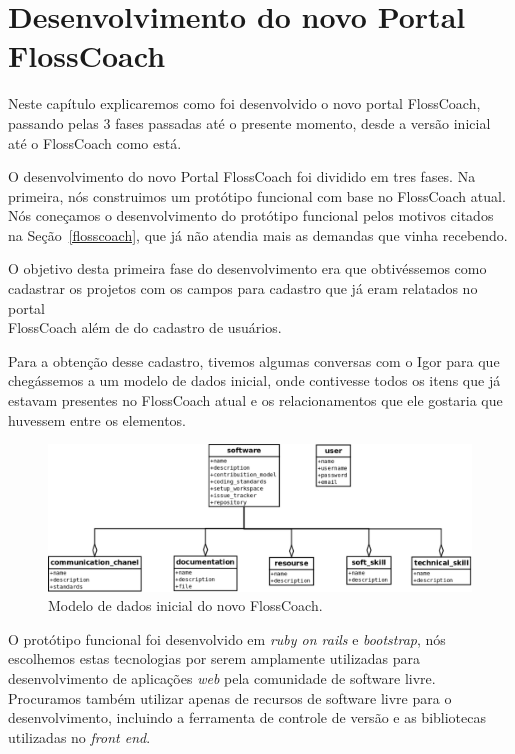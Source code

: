 \chapter{Desenvolvimento do novo Portal \\FlossCoach}
\label{desenvolvimento}

Neste capítulo explicaremos como foi desenvolvido o novo portal FlossCoach, passando
pelas 3 fases passadas até o presente momento, desde a versão inicial até o FlossCoach
como está.

O desenvolvimento do novo Portal FlossCoach foi dividido em tres fases. Na primeira, 
nós construimos um protótipo funcional com base no FlossCoach atual. Nós coneçamos o
desenvolvimento do protótipo funcional pelos motivos citados na Seção~\ref{flosscoach},
que já não atendia mais as demandas que vinha recebendo.

O objetivo desta primeira fase do desenvolvimento era que obtivéssemos como cadastrar 
os projetos com os campos para cadastro que já eram relatados no portal \\FlossCoach 
além de do cadastro de usuários.

Para a obtenção desse cadastro, tivemos algumas conversas com o Igor para que chegássemos
a um modelo de dados inicial, onde contivesse todos os itens que já estavam presentes no
FlossCoach atual e os relacionamentos que ele gostaria que huvessem entre os elementos.

\begin{figure}[h]
	\centering
	\label{fig:diagrama_iicial}
		\includegraphics[keepaspectratio=true,scale=0.35]{figuras/diagrama_inicial.eps}
	\caption{Modelo de dados inicial do novo FlossCoach.}
\end{figure}

O protótipo funcional foi desenvolvido em \textit{ruby on rails} e \textit{bootstrap},
nós escolhemos estas tecnologias por serem amplamente utilizadas para desenvolvimento
de aplicações \textit{web} pela comunidade de software livre. Procuramos também utilizar
apenas de recursos de software livre para o desenvolvimento, incluindo a ferramenta de 
controle de versão e as bibliotecas utilizadas no \textit{front end}.

